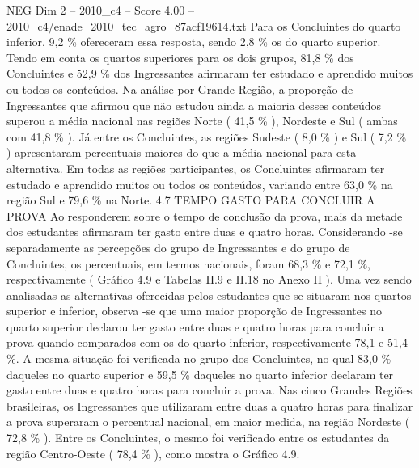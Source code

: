 \begin{textsample}{NEG Dim 2 – 2010\_c4 – Score 4.00 – 2010\_c4/enade\_2010\_tec\_agro\_87acf19614.txt}
Para os Concluintes do quarto inferior, 9,2 \% ofereceram essa resposta, sendo 2,8 \% os do quarto superior.
Tendo em conta os quartos superiores para os dois grupos, 81,8 \% dos Concluintes e 52,9 \% dos Ingressantes afirmaram ter estudado e aprendido muitos ou todos os conteúdos.
Na análise por Grande Região, a proporção de Ingressantes que afirmou que não estudou ainda a maioria desses conteúdos superou a média nacional nas regiões Norte ( 41,5 \% ), Nordeste e Sul ( ambas com 41,8 \% ).
Já entre os Concluintes, as regiões Sudeste ( 8,0 \% ) e Sul ( 7,2 \% ) apresentaram percentuais maiores do que a média nacional para esta alternativa.
Em todas as regiões participantes, os Concluintes afirmaram ter estudado e aprendido muitos ou todos os conteúdos, variando entre 63,0 \% na região Sul e 79,6 \% na Norte. 4.7 TEMPO GASTO PARA CONCLUIR A PROVA Ao responderem sobre o tempo de conclusão da prova, mais da metade dos estudantes afirmaram ter gasto entre duas e quatro horas.
Considerando -se separadamente as percepções do grupo de Ingressantes e do grupo de Concluintes, os percentuais, em termos nacionais, foram 68,3 \% e 72,1 \%, respectivamente ( Gráfico 4.9 e Tabelas II.9 e II.18 no Anexo II ).
Uma vez sendo analisadas as alternativas oferecidas pelos estudantes que se situaram nos quartos superior e inferior, observa -se que uma maior proporção de Ingressantes no quarto superior declarou ter gasto entre duas e quatro horas para concluir a prova quando comparados com os do quarto inferior, respectivamente 78,1 e 51,4 \%.
A mesma situação foi verificada no grupo dos Concluintes, no qual 83,0 \% daqueles no quarto superior e 59,5 \% daqueles no quarto inferior declaram ter gasto entre duas e quatro horas para concluir a prova.
Nas cinco Grandes Regiões brasileiras, os Ingressantes que utilizaram entre duas a quatro horas para finalizar a prova superaram o percentual nacional, em maior medida, na região Nordeste ( 72,8 \% ).
Entre os Concluintes, o mesmo foi verificado entre os estudantes da região Centro-Oeste ( 78,4 \% ), como mostra o Gráfico 4.9.

\end{textsample}

